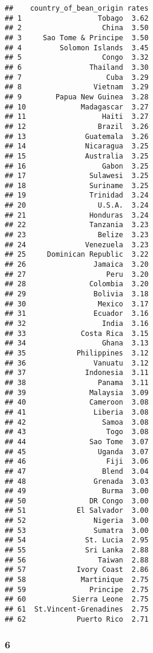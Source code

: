 \documentclass[
]{article}
\begin{document}
\begin{verbatim}
##    country_of_bean_origin rates
## 1                  Tobago  3.62
## 2                   China  3.50
## 3     Sao Tome & Principe  3.50
## 4         Solomon Islands  3.45
## 5                   Congo  3.32
## 6                Thailand  3.30
## 7                    Cuba  3.29
## 8                 Vietnam  3.29
## 9        Papua New Guinea  3.28
## 10             Madagascar  3.27
## 11                  Haiti  3.27
## 12                 Brazil  3.26
## 13              Guatemala  3.26
## 14              Nicaragua  3.25
## 15              Australia  3.25
## 16                  Gabon  3.25
## 17               Sulawesi  3.25
## 18               Suriname  3.25
## 19               Trinidad  3.24
## 20                 U.S.A.  3.24
## 21               Honduras  3.24
## 22               Tanzania  3.23
## 23                 Belize  3.23
## 24              Venezuela  3.23
## 25     Dominican Republic  3.22
## 26                Jamaica  3.20
## 27                   Peru  3.20
## 28               Colombia  3.20
## 29                Bolivia  3.18
## 30                 Mexico  3.17
## 31                Ecuador  3.16
## 32                  India  3.16
## 33             Costa Rica  3.15
## 34                  Ghana  3.13
## 35            Philippines  3.12
## 36                Vanuatu  3.12
## 37              Indonesia  3.11
## 38                 Panama  3.11
## 39               Malaysia  3.09
## 40               Cameroon  3.08
## 41                Liberia  3.08
## 42                  Samoa  3.08
## 43                   Togo  3.08
## 44               Sao Tome  3.07
## 45                 Uganda  3.07
## 46                   Fiji  3.06
## 47                  Blend  3.04
## 48                Grenada  3.03
## 49                  Burma  3.00
## 50               DR Congo  3.00
## 51            El Salvador  3.00
## 52                Nigeria  3.00
## 53                Sumatra  3.00
## 54              St. Lucia  2.95
## 55              Sri Lanka  2.88
## 56                 Taiwan  2.88
## 57            Ivory Coast  2.86
## 58             Martinique  2.75
## 59               Principe  2.75
## 60           Sierra Leone  2.75
## 61  St.Vincent-Grenadines  2.75
## 62            Puerto Rico  2.71
\end{verbatim}

\hypertarget{section-4}{%
\subsubsection{6}\label{section-4}}
\end{document}
